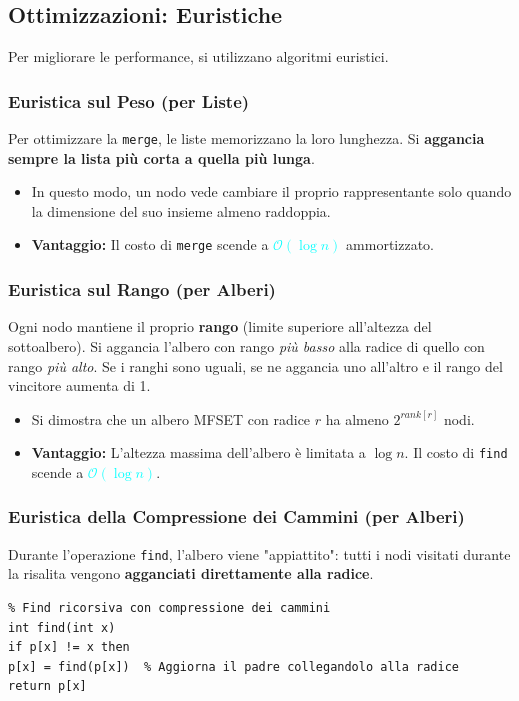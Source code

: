 \documentclass[12pt, a4paper]{article}
\begin{document}
\subsection{Ottimizzazioni: Euristiche}
Per migliorare le performance, si utilizzano algoritmi euristici.

\subsubsection{Euristica sul Peso (per Liste)}
Per ottimizzare la \texttt{merge}, le liste memorizzano la loro lunghezza. Si \textbf{aggancia sempre la lista più corta a quella più lunga}.
\begin{itemize}
\item In questo modo, un nodo vede cambiare il proprio rappresentante solo quando la dimensione del suo insieme almeno raddoppia.
\item \textbf{Vantaggio:} Il costo di \texttt{merge} scende a \textcolor{cyan}{$\mathcal{O}(\log n)$} ammortizzato.
\end{itemize}

\subsubsection{Euristica sul Rango (per Alberi)}
Ogni nodo mantiene il proprio \textbf{rango} (limite superiore all'altezza del sottoalbero). Si aggancia l'albero con rango \textit{più basso} alla radice di quello con rango \textit{più alto}. Se i ranghi sono uguali, se ne aggancia uno all'altro e il rango del vincitore aumenta di 1.
\begin{itemize}
\item Si dimostra che un albero MFSET con radice $r$ ha almeno $2^{rank[r]}$ nodi.
\item \textbf{Vantaggio:} L'altezza massima dell'albero è limitata a $\log n$. Il costo di \texttt{find} scende a \textcolor{cyan}{$\mathcal{O}(\log n)$}.
\end{itemize}

\subsubsection{Euristica della Compressione dei Cammini (per Alberi)}
Durante l'operazione \texttt{find}, l'albero viene "appiattito": tutti i nodi visitati durante la risalita vengono \textbf{agganciati direttamente alla radice}.
\begin{verbatim}
% Find ricorsiva con compressione dei cammini
int find(int x)
if p[x] != x then
p[x] = find(p[x])  % Aggiorna il padre collegandolo alla radice
return p[x]
\end{verbatim}
\end{document}
